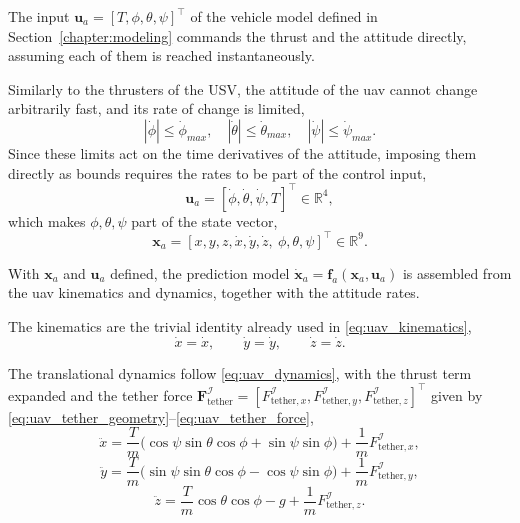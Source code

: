 The input $\mathbf{u}_a = [T,\phi,\theta,\psi]^\top$ of the vehicle model defined in Section~\ref{chapter:modeling} commands the thrust and the attitude directly, assuming each of them is reached instantaneously.

Similarly to the thrusters of the USV, the attitude of the \gls{uav} cannot change arbitrarily fast, and its rate of change is limited,
\begin{equation}
    |\dot\phi| \le \dot\phi_{max}, \quad |\dot\theta| \le \dot\theta_{max}, \quad |\dot\psi| \le \dot\psi_{max}.
    \label{eq:uav_mpc_rate_bounds}
\end{equation}
Since these limits act on the time derivatives of the attitude, imposing them directly as bounds requires the rates to be part of the control input,
\begin{equation}
    \mathbf{u}_a = [\dot\phi,\dot\theta,\dot\psi,T]^\top \in \mathbb{R}^4,
    \label{eq:uav_mpc_input_augmented}
\end{equation}
which makes $\phi,\theta,\psi$ part of the state vector,
\begin{equation}
    \mathbf{x}_a = [x,y,z,\dot x,\dot y,\dot z,\ \phi,\theta,\psi]^\top \in \mathbb{R}^{9}.
    \label{eq:uav_mpc_state_augmented}
\end{equation}

With $\mathbf{x}_a$ and $\mathbf{u}_a$ defined, the prediction model $\dot{\mathbf{x}}_a = \mathbf{f}_a(\mathbf{x}_a,\mathbf{u}_a)$ is assembled from the \gls{uav} kinematics and dynamics, together with the attitude rates.

The kinematics are the trivial identity already used in \eqref{eq:uav_kinematics},
\begin{equation}
    \dot x = \dot x, \qquad \dot y = \dot y, \qquad \dot z = \dot z.
    \label{eq:uav_mpc_kinematics}
\end{equation}

The translational dynamics follow \eqref{eq:uav_dynamics}, with the thrust term expanded and the tether force $\mathbf{F}_{\mathrm{tether}}^{\mathcal{I}} = [F_{\mathrm{tether},x}^{\mathcal{I}}, F_{\mathrm{tether},y}^{\mathcal{I}}, F_{\mathrm{tether},z}^{\mathcal{I}}]^\top$ given by \eqref{eq:uav_tether_geometry}--\eqref{eq:uav_tether_force},
\begin{equation}
    \ddot x = \frac{T}{m}\big(\cos\psi\sin\theta\cos\phi+\sin\psi\sin\phi\big) + \frac{1}{m}F_{\mathrm{tether},x}^{\mathcal{I}},
    \label{eq:uav_mpc_xddot}
\end{equation}
\begin{equation}
    \ddot y = \frac{T}{m}\big(\sin\psi\sin\theta\cos\phi-\cos\psi\sin\phi\big) + \frac{1}{m}F_{\mathrm{tether},y}^{\mathcal{I}},
    \label{eq:uav_mpc_yddot}
\end{equation}
\begin{equation}
    \ddot z = \frac{T}{m}\cos\theta\cos\phi - g + \frac{1}{m}F_{\mathrm{tether},z}^{\mathcal{I}}.
    \label{eq:uav_mpc_zddot}
\end{equation}


